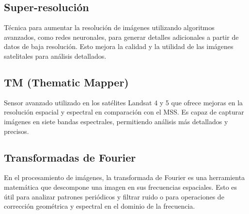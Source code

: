             \subsection{Super-resolución}
                Técnica para aumentar la resolución de imágenes utilizando algoritmos avanzados, como redes neuronales, para generar detalles adicionales a partir de datos de baja resolución. Esto mejora la calidad y la utilidad de las imágenes satelitales para análisis detallados.
            
            \subsection{TM (Thematic Mapper)}
                Sensor avanzado utilizado en los satélites Landsat 4 y 5 que ofrece mejoras en la resolución espacial y espectral en comparación con el MSS. Es capaz de capturar imágenes en siete bandas espectrales, permitiendo análisis más detallados y precisos.
            
            \subsection{Transformadas de Fourier}
                En el procesamiento de imágenes, la transformada de Fourier es una herramienta matemática que descompone una imagen en sus frecuencias espaciales. Esto es útil para analizar patrones periódicos y filtrar ruido o para operaciones de corrección geométrica y espectral en el dominio de la frecuencia.
            